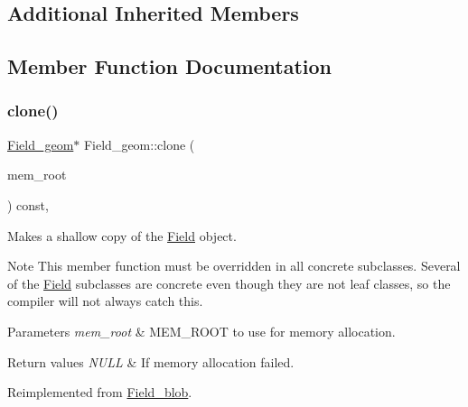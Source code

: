 \subsection*{Additional Inherited Members}


\subsection{Member Function Documentation}
\mbox{\label{classField__geom_a79a6e5a31b39dbaddfef43ede4d82d40}} 
\subsubsection{\texorpdfstring{clone()}{clone()}\hspace{0.1cm}{\footnotesize\ttfamily [1/2]}}
{\footnotesize\ttfamily \mbox{\hyperlink{classField__geom}{Field\+\_\+geom}}$\ast$ Field\+\_\+geom\+::clone (\begin{DoxyParamCaption}\item[{M\+E\+M\+\_\+\+R\+O\+OT $\ast$}]{mem\+\_\+root }\end{DoxyParamCaption}) const\hspace{0.3cm}{\ttfamily [inline]}, {\ttfamily [virtual]}}

Makes a shallow copy of the \mbox{\hyperlink{classField}{Field}} object.

\begin{DoxyNote}{Note}
This member function must be overridden in all concrete subclasses. Several of the \mbox{\hyperlink{classField}{Field}} subclasses are concrete even though they are not leaf classes, so the compiler will not always catch this.
\end{DoxyNote}

\begin{DoxyParams}{Parameters}
{\em mem\+\_\+root} & M\+E\+M\+\_\+\+R\+O\+OT to use for memory allocation. \\
\hline
\end{DoxyParams}

\begin{DoxyRetVals}{Return values}
{\em N\+U\+LL} & If memory allocation failed. \\
\hline
\end{DoxyRetVals}


Reimplemented from \mbox{\hyperlink{classField__blob_adb81abc88601964eb822c176bd192c6a}{Field\+\_\+blob}}.

